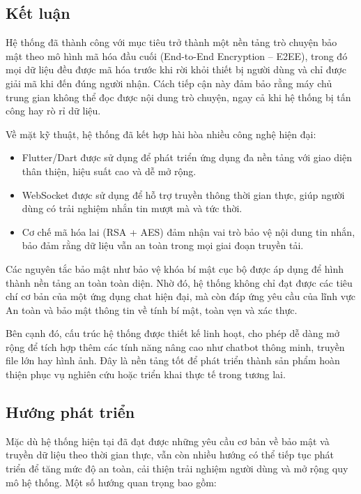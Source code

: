 \setcounter{section}{0}
\renewcommand{\thesubsection}{\arabic{subsection}.}

\subsection{Kết luận}
\indent Hệ thống đã thành công với mục tiêu trở thành một nền tảng trò chuyện bảo mật theo mô hình mã hóa đầu cuối (End-to-End Encryption – E2EE), trong đó mọi dữ liệu đều được mã hóa trước khi rời khỏi thiết bị người dùng và chỉ được giải mã khi đến đúng người nhận. Cách tiếp cận này đảm bảo rằng máy chủ trung gian không thể đọc được nội dung trò chuyện, ngay cả khi hệ thống bị tấn công hay rò rỉ dữ liệu.

\indent Về mặt kỹ thuật, hệ thống đã kết hợp hài hòa nhiều công nghệ hiện đại:
\begin{itemize}
  \item Flutter/Dart được sử dụng để phát triển ứng dụng đa nền tảng với giao diện thân thiện, hiệu suất cao và dễ mở rộng.
  \item WebSocket được sử dụng để hỗ trợ truyền thông thời gian thực, giúp người dùng có trải nghiệm nhắn tin mượt mà và tức thời.
  \item Cơ chế mã hóa lai (RSA + AES) đảm nhận vai trò bảo vệ nội dung tin nhắn, bảo đảm rằng dữ liệu vẫn an toàn trong mọi giai đoạn truyền tải.

\end{itemize}

\indent Các nguyên tắc bảo mật như bảo vệ khóa bí mật cục bộ được áp dụng để hình thành nền tảng an toàn toàn diện. Nhờ đó, hệ thống không chỉ đạt được các tiêu chí cơ bản của một ứng dụng chat hiện đại, mà còn đáp ứng yêu cầu của lĩnh vực An toàn và bảo mật thông tin về tính bí mật, toàn vẹn và xác thực.

\indent Bên cạnh đó, cấu trúc hệ thống được thiết kế linh hoạt, cho phép dễ dàng mở rộng để tích hợp thêm các tính năng nâng cao như chatbot thông minh, truyền file lớn hay hình ảnh. Đây là nền tảng tốt để phát triển thành sản phẩm hoàn thiện phục vụ nghiên cứu hoặc triển khai thực tế trong tương lai.

\subsection{Hướng phát triển}
\indent Mặc dù hệ thống hiện tại đã đạt được những yêu cầu cơ bản về bảo mật và truyền dữ liệu theo thời gian thực, vẫn còn nhiều hướng có thể tiếp tục phát triển để tăng mức độ an toàn, cải thiện trải nghiệm người dùng và mở rộng quy mô hệ thống. Một số hướng quan trọng bao gồm:

